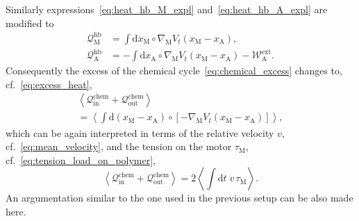 \documentclass[aps,pre,twocolumn,showpacs,showkeys,superscriptaddress,floatfix]{revtex4-1}
\newcommand{\rmd}{{\mathrm d}}
\begin{document}
Similarly expressions~\eqref{eq:heat_hb_M_expl} and~\eqref{eq:heat_hb_A_expl} are modified to
\begin{align*}
{\mathcal Q}_\text{M}^\text{hb} 
&= \int \rmd x_\text{M} \circ \nabla_\text{M} V_t(x_\text{M} - x_\text{A} ) ,
\\
{\mathcal Q}_\text{A}^\text{hb} 
&= - \int \rmd x_\text{A} \circ \nabla_\text{M} V_t(x_\text{M} - x_\text{A} ) - {\mathcal W}_\text{A}^\text{ext} .
\end{align*} 
Consequently the excess of the chemical cycle~\eqref{eq:chemical_excess} changes to, cf.~\eqref{eq:excess_heat}, 
\begin{multline*}
\left\langle 
{\mathcal Q}_\text{in}^\text{chem} + {\mathcal Q}_\text{out}^\text{chem} 
\right\rangle 
\\
= 
\left\langle 
\int \rmd \left( x_\text{M} - x_\text{A} \right) \circ \left[ - \nabla_\text{M} V_t( x_\text{M} - x_\text{A} ) \right]
\right\rangle ,
\end{multline*} 
which can be again interpreted in terms of the relative velocity $v$, cf.~\eqref{eq:mean_velocity}, 
and the tension on the motor $\tau_\text{M}$, cf.~\eqref{eq:tension_load_on_polymer},  
\begin{equation}
\left\langle 
{\mathcal Q}_\text{in}^\text{chem} + {\mathcal Q}_\text{out}^\text{chem} 
\right\rangle 
= 2 \left\langle \int \rmd t \; v \, \tau_\text{M} \right\rangle .
\label{eq:chemical_excess_poly}
\end{equation}
An argumentation similar to the one used in the previous setup can be also made here. 
\end{document}
